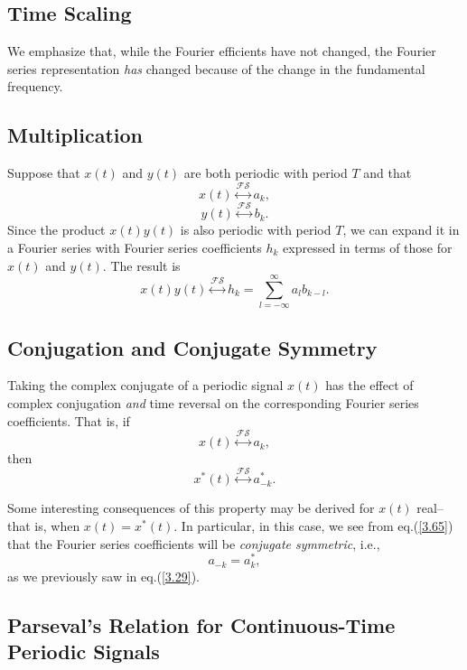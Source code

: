 \documentclass[a4paper,twoside]{book}
\begin{document}
\subsection{Time Scaling}

We emphasize that, while the Fourier efficients have not changed, the Fourier series representation \textit{has} changed because of the change in the fundamental frequency.

\subsection{Multiplication}

Suppose that $x(t)$ and $y(t)$ are both periodic with period $T$ and that $$x(t)\overset{\mathcal{FS}}{\longleftrightarrow}a_k,$$$$y(t)\overset{\mathcal{FS}}{\longleftrightarrow}b_k.$$ Since the product $x(t)y(t)$ is also periodic with period $T$, we can expand it in a Fourier series with Fourier series coefficients $h_k$ expressed in terms of those for $x(t)$ and $y(t)$. The result is
\begin{equation}
    x(t)y(t)\overset{\mathcal{FS}}{\longleftrightarrow} h_k=\sum_{l=-\infty}^\infty a_lb_{k-l}.
    \label{3.64}
\end{equation}

\subsection{Conjugation and Conjugate Symmetry}

Taking the complex conjugate of a periodic signal $x(t)$ has the effect of complex conjugation \textit{and} time reversal on the corresponding Fourier series coefficients. That is, if $$x(t)\overset{\mathcal{FS}}{\longleftrightarrow}a_k,$$ then
\begin{equation}
    x^*(t)\overset{\mathcal{FS}}{\longleftrightarrow}a_{-k}^*.
    \label{3.65}
\end{equation}

Some interesting consequences of this property may be derived for $x(t)$ real--that is, when $x(t)=x^*(t)$. In particular, in this case, we see from eq.\;(\ref{3.65}) that the Fourier series coefficients will be \textit{conjugate symmetric}, i.e.,
\begin{equation}
    a_{-k}=a_k^*,
    \label{3.66}
\end{equation}
as we previously saw in eq.\;(\ref{3.29}).

\subsection{Parseval's Relation for Continuous-Time Periodic Signals}
\end{document}
